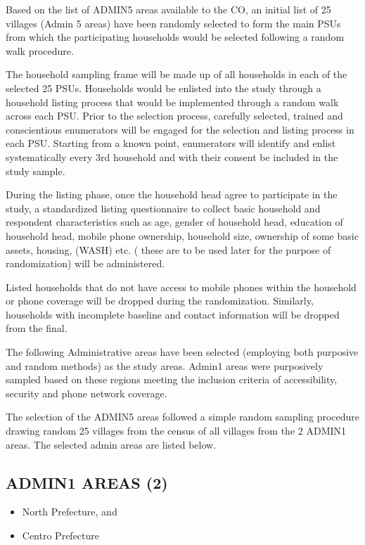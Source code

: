 \documentclass[11pt,harvard]{article}
\begin{document}
Based on the list of ADMIN5 areas available to the CO, an initial list of 25 villages (Admin 5 areas) have been randomly selected to form the main PSUs from which the participating households would be selected following a random walk procedure. 

The household sampling frame will be made up of all households in each of the selected 25 PSUs. Households would be enlisted into the study through a household listing process that would be implemented through a random walk across each PSU. Prior to the selection process, carefully selected, trained and conscientious enumerators will be engaged for the selection and listing process in each PSU. Starting from a known point, enumerators will identify and enlist systematically every 3rd household and with their consent be included in the study sample.

During the listing phase, once the household head agree to participate in the study, a standardized listing questionnaire to collect basic household and respondent characteristics such as age, gender of household head, education of household head, mobile phone ownership, household size, ownership of some basic assets, housing, (WASH) etc. ( these are to be used later for the purpose of randomization) will be administered. 

Listed households that do not have access to mobile phones within the household or phone coverage will be dropped during the randomization. Similarly, households with incomplete baseline and contact information will be dropped from the final. 

The following Administrative areas have been selected (employing both purposive and random methods) as the study areas. Admin1 areas were purposively sampled based on these regions meeting the inclusion criteria of accessibility, security and phone network coverage. 

The selection of the ADMIN5 areas followed a simple random sampling procedure drawing random 25 villages from the census of all villages from the 2 ADMIN1 areas. The selected admin areas are listed below.

\subsection*{ADMIN1 AREAS (2)}
\begin{itemize}[left=2.0em]
	\item[1.]North Prefecture, and
	\item[2.]Centro Prefecture
\end{itemize}
\end{document}
